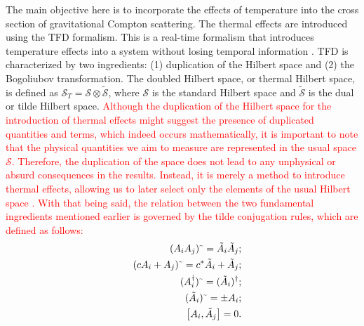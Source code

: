 \documentclass[11pt,showpacs,preprintnumbers,amsmath,amssymb,prd,nofootinbib,superscriptaddress]{revtex4-2}
\newcommand{\til}{\text{\textasciitilde}}
\begin{document}
The main objective here is to incorporate the effects of temperature into the cross section of gravitational Compton scattering. The thermal effects are introduced using the TFD formalism. This is a real-time formalism that introduces temperature effects into a system without losing temporal information \textcolor{red}{\cite{Umezawa1, Umezawa2, Book, Umezawa22, Khanna1, Khanna2, Santana1, Santana2}}. TFD is characterized by two ingredients: (1) duplication of the Hilbert space and (2) the Bogoliubov transformation. The doubled Hilbert space, or thermal Hilbert space, is defined as $\mathcal{S}_T = \mathcal{S} \otimes \tilde{\mathcal{S}}$, where $\mathcal{S}$ is the standard Hilbert space and $\tilde{\mathcal{S}}$ is the dual or tilde Hilbert space. \textcolor{red}{Although the duplication of the Hilbert space for the introduction of thermal effects might suggest the presence of duplicated quantities and terms, which indeed occurs mathematically, it is important to note that the physical quantities we aim to measure are represented in the usual space $\mathcal{S}$. Therefore, the duplication of the space does not lead to any unphysical or absurd consequences in the results. Instead, it is merely a method to introduce thermal effects, allowing us to later select only the elements of the usual Hilbert space \cite{Book}. With that being said, the relation between the two fundamental ingredients mentioned earlier is governed by the tilde conjugation rules, which are defined as follows:}
\begin{eqnarray}
    &&(A_iA_j)^\til=\Tilde{A}_i\Tilde{A}_j;\nonumber\\
    &&(cA_i+A_j)^\til=c^*\Tilde{A}_i+\Tilde{A}_j;\nonumber\\
    &&(A_i^\dagger)^\til=(\Tilde{A}_i)^\dagger;\\
    &&(\Tilde{A}_i)^\til=\pm A_i;\nonumber\\
   &&\comm{A_i}{\Tilde{A}_j}=0.\nonumber
\end{eqnarray}	
\end{document}
